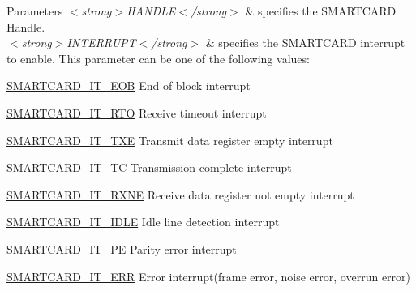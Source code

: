 \begin{DoxyParams}{Parameters}
{\em $<$strong$>$\+H\+A\+N\+D\+L\+E$<$/strong$>$} & specifies the S\+M\+A\+R\+T\+C\+A\+RD Handle. \\
\hline
{\em $<$strong$>$\+I\+N\+T\+E\+R\+R\+U\+P\+T$<$/strong$>$} & specifies the S\+M\+A\+R\+T\+C\+A\+RD interrupt to enable. This parameter can be one of the following values\+: \begin{DoxyItemize}
\item \hyperlink{group___s_m_a_r_t_c_a_r_d___interrupt__definition_ga0f1d46faf880c6d17c9156c049206a7c}{S\+M\+A\+R\+T\+C\+A\+R\+D\+\_\+\+I\+T\+\_\+\+E\+OB} End of block interrupt \item \hyperlink{group___s_m_a_r_t_c_a_r_d___interrupt__definition_ga9834b14912101cac858fd7b5de574f02}{S\+M\+A\+R\+T\+C\+A\+R\+D\+\_\+\+I\+T\+\_\+\+R\+TO} Receive timeout interrupt \item \hyperlink{group___s_m_a_r_t_c_a_r_d___interrupt__definition_ga758561a96d28254dc3504cb5325dad1f}{S\+M\+A\+R\+T\+C\+A\+R\+D\+\_\+\+I\+T\+\_\+\+T\+XE} Transmit data register empty interrupt \item \hyperlink{group___s_m_a_r_t_c_a_r_d___interrupt__definition_ga808ee7d7c209374af004e8bf1d2ca492}{S\+M\+A\+R\+T\+C\+A\+R\+D\+\_\+\+I\+T\+\_\+\+TC} Transmission complete interrupt \item \hyperlink{group___s_m_a_r_t_c_a_r_d___interrupt__definition_ga75b6c6e283a114afa1130f6f1bc98da6}{S\+M\+A\+R\+T\+C\+A\+R\+D\+\_\+\+I\+T\+\_\+\+R\+X\+NE} Receive data register not empty interrupt \item \hyperlink{group___s_m_a_r_t_c_a_r_d___interrupt__definition_ga0b1a5f7e611a976c71168a5b9e3a1f0e}{S\+M\+A\+R\+T\+C\+A\+R\+D\+\_\+\+I\+T\+\_\+\+I\+D\+LE} Idle line detection interrupt \item \hyperlink{group___s_m_a_r_t_c_a_r_d___interrupt__definition_gac56e07a71ab82a23930ad58e9a8dc806}{S\+M\+A\+R\+T\+C\+A\+R\+D\+\_\+\+I\+T\+\_\+\+PE} Parity error interrupt \item \hyperlink{group___s_m_a_r_t_c_a_r_d___interrupt__definition_ga751761f820948ee230b30a244ca85725}{S\+M\+A\+R\+T\+C\+A\+R\+D\+\_\+\+I\+T\+\_\+\+E\+RR} Error interrupt(frame error, noise error, overrun error) \end{DoxyItemize}
\\
\hline
\end{DoxyParams}

